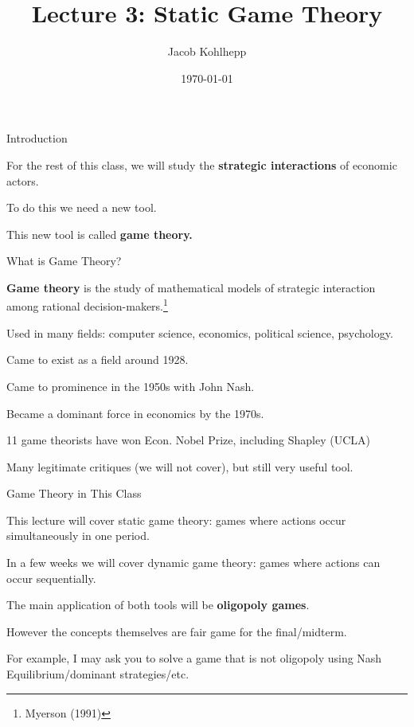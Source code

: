 \documentclass[aspectratio=169]{beamer}
\title[Game Theory]{Lecture 3: Static Game Theory} %
\author{Jacob Kohlhepp} %
\institute[UCLA] %
{
Econ 101 \\ %
\medskip
}
\date{\today} %
\newenvironment{wideitemize}{\itemize\addtolength{\itemsep}{10pt}}{\enditemize}
\begin{document}
\begin{frame}
\titlepage %
\end{frame}

\begin{frame}{Introduction}
\begin{wideitemize}
    \item For the rest of this class, we will study the \textbf{strategic interactions} of economic actors.
    \item To do this we need a new tool.
    \item This new tool is called \textbf{game theory.}
\end{wideitemize}

\end{frame}

\begin{frame}{What is Game Theory?}
\begin{definition}
\textbf{Game theory} is the study of mathematical models of strategic interaction among rational decision-makers.\footnote{Myerson (1991)}
\end{definition}
\begin{wideitemize}
    \item Used in many fields: computer science, economics, political science, psychology.
    \item Came to exist as a field around 1928.
    \item Came to prominence in the 1950s with John Nash.
    \item Became a dominant force in economics by the 1970s.
    \item 11 game theorists have won Econ. Nobel Prize, including Shapley (UCLA)
    \item Many legitimate critiques (we will not cover), but still very useful tool.
\end{wideitemize}
\end{frame}

\begin{frame}{Game Theory in This Class}
\begin{wideitemize}
    \item This lecture will cover static game theory: games where actions occur simultaneously in one period.
    \item In a few weeks we will cover dynamic game theory: games where actions can occur sequentially.
    \item The main application of both tools will be \textbf{oligopoly games}.
    \item However the concepts themselves are fair game for the final/midterm.
    \item For example, I may ask you to solve a game that is not oligopoly using Nash Equilibrium/dominant strategies/etc.
\end{wideitemize}

\end{frame}
\end{document}
